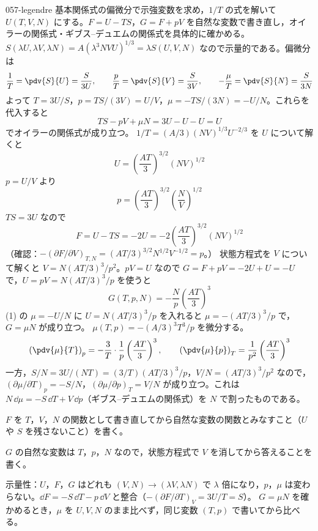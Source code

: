 \documentclass[uplatex,dvipdfmx,a4paper,11pt]{jsarticle}
\begin{document}
\begin{kaisetsu}{057-legendre}
\houshin 基本関係式の偏微分で示強変数を求め，$1/T$ の式を解いて $U(T,V,N)$ にする。$F=U-TS$，$G=F+pV$ を自然な変数で書き直し，オイラーの関係式・ギブス--デュエムの関係式を具体的に確かめる。
\keisan {} $S(\lambda U,\lambda V,\lambda N)=A(\lambda^{3}NVU)^{1/3}=\lambda S(U,V,N)$ なので示量的である。偏微分は
\[ \frac{1}{T}=\pdv{S}{U}=\frac{S}{3U},\qquad \frac{p}{T}=\pdv{S}{V}=\frac{S}{3V},\qquad -\frac{\mu}{T}=\pdv{S}{N}=\frac{S}{3N} \]
よって $T=3U/S$，$p=TS/(3V)=U/V$，$\mu=-TS/(3N)=-U/N$。これらを代入すると
\[ TS-pV+\mu N=3U-U-U=U \]
でオイラーの関係式が成り立つ。
 $1/T=(A/3)(NV)^{1/3}U^{-2/3}$ を $U$ について解くと
\[ U=\left(\frac{AT}{3}\right)^{3/2}(NV)^{1/2} \]
$p=U/V$ より
\[ p=\left(\frac{AT}{3}\right)^{3/2}\left(\frac{N}{V}\right)^{1/2} \]
$TS=3U$ なので
\[ F=U-TS=-2U=-2\left(\frac{AT}{3}\right)^{3/2}(NV)^{1/2} \]
（確認：$-(\partial F/\partial V)_{T,N}=(AT/3)^{3/2}N^{1/2}V^{-1/2}=p$。）
 状態方程式を $V$ について解くと $V=N(AT/3)^{3}/p^{2}$。$pV=U$ なので $G=F+pV=-2U+U=-U$ で，$U=pV=N(AT/3)^{3}/p$ を使うと
\[ G(T,p,N)=-\frac{N}{p}\left(\frac{AT}{3}\right)^{3} \]
(1) の $\mu=-U/N$ に $U=N(AT/3)^{3}/p$ を入れると $\mu=-(AT/3)^{3}/p$ で，$G=\mu N$ が成り立つ。
 $\mu(T,p)=-(A/3)^{3}T^{3}/p$ を微分する。
\[ \left(\pdv{\mu}{T}\right)_{p}=-\frac{3}{T}\cdot\frac{1}{p}\left(\frac{AT}{3}\right)^{3},\qquad \left(\pdv{\mu}{p}\right)_{T}=\frac{1}{p^{2}}\left(\frac{AT}{3}\right)^{3} \]
一方，$S/N=3U/(NT)=(3/T)(AT/3)^{3}/p$，$V/N=(AT/3)^{3}/p^{2}$ なので，$(\partial\mu/\partial T)_{p}=-S/N$，$(\partial\mu/\partial p)_{T}=V/N$ が成り立つ。これは $N\,\dd\mu=-S\,\dd T+V\,\dd p$（ギブス--デュエムの関係式）を $N$ で割ったものである。
\begin{ronten}
  \item {} $F$ を $T$，$V$，$N$ の関数として書き直してから自然な変数の関数とみなすこと（$U$ や $S$ を残さないこと）を書く。
  \item {} $G$ の自然な変数は $T$，$p$，$N$ なので，状態方程式で $V$ を消してから答えることを書く。
\end{ronten}
\kenzan 示量性：$U$，$F$，$G$ はどれも $(V,N)\to(\lambda V,\lambda N)$ で $\lambda$ 倍になり，$p$，$\mu$ は変わらない。$\dd F=-S\,\dd T-p\,\dd V$ と整合（$-(\partial F/\partial T)_{V}=3U/T=S$）。
\tsumazuki $G=\mu N$ を確かめるとき，$\mu$ を $U,V,N$ のまま比べず，同じ変数 $(T,p)$ で書いてから比べる。
\end{kaisetsu}
\end{document}

